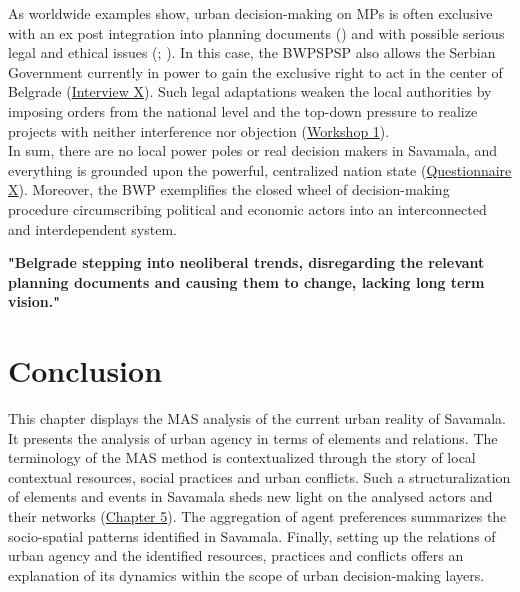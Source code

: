 \documentclass[11pt]{report}
\begin{document}
{{{{As worldwide examples show, urban decision-making on MPs is often exclusive with an ex post integration into planning documents (\href{Kennedy}{\citealt{kennedy_large_2013}})
and with possible serious legal and ethical issues (\href{Flyvbjerg2009}{\citealt{Flyvbjerg_survival_2009}}; \href{Flyvbjerg}{\citealt{flyvbjerg_megaprojects_2003}}).%
In this case, the BWPSPSP also allows the Serbian Government currently in power to gain the exclusive right to act in the center of Belgrade  (\href{InterviewX}{Interview X}).
Such legal adaptations weaken the local authorities by imposing orders from the national level and the top-down pressure to realize projects with neither interference nor objection
(\href{Expert Workshop}{Workshop 1}).
\\

In sum, there are no local power poles or real decision makers in Savamala, and everything is grounded upon the powerful, centralized nation state
(\href{Questionnaire Experts Savamala}{Questionnaire X}).
Moreover, the BWP exemplifies the closed wheel of decision-making procedure circumscribing political and economic actors into an interconnected and interdependent system.

\textbf{"Belgrade stepping into neoliberal trends, disregarding the relevant planning documents and causing them to change, lacking long term vision."} \cite{doytchinov_belgrade:_2015}

\section{Conclusion}

This chapter displays the MAS analysis of  the current urban reality of Savamala. It presents the analysis of urban agency in terms of elements and relations. The terminology of the MAS method is contextualized through the story of local contextual resources, social practices and urban conflicts. Such a structuralization of elements and events in Savamala sheds new light on the  analysed actors and their networks (\href{Chapter 5}{Chapter 5}). The aggregation of agent preferences summarizes the socio-spatial patterns identified in Savamala. Finally, setting up the relations of urban agency and the identified resources, practices and conflicts offers an explanation of its dynamics within the scope of urban decision-making layers.
\\

}}}}
\end{document}
